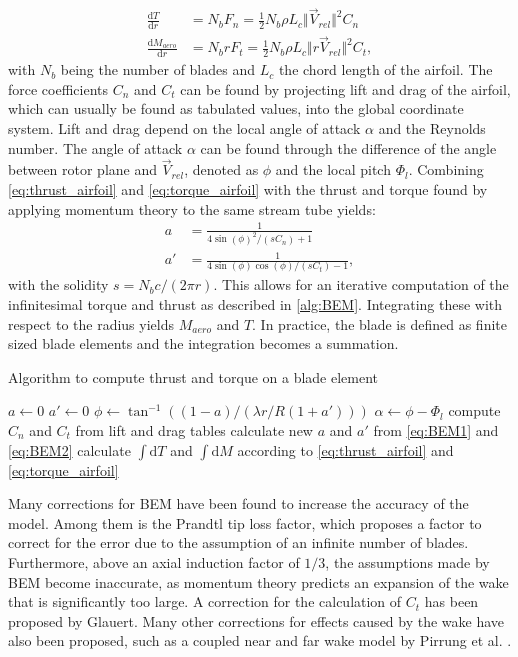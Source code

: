 \begin{align}
\frac{\mathrm{d}T}{\mathrm{d}r} &=N_b F_n = \frac{1}{2}N_b \rho L_c \Vert \vec{V}_{rel} \Vert^2 C_n \label{eq:thrust_airfoil}\\
\frac{\mathrm{d}M_{aero}}{\mathrm{d}r} &= N_b r F_t = \frac{1}{2} N_b\rho L_c \Vert r \vec{V}_{rel} \Vert^2 C_t, \label{eq:torque_airfoil}
\end{align} with $N_b$ being the number of blades and $L_c$ the chord length of the airfoil. The force coefficients $C_n$ and $C_t$ can be found by projecting lift and drag of the airfoil, which can usually be found as tabulated values, into the global coordinate system. Lift and drag depend on the local angle of attack $\alpha$ and the Reynolds number. The angle of attack $\alpha$ can be found through the difference of the angle between rotor plane and $\vec{V}_{rel}$, denoted as $\phi$ and the local pitch $\Phi_l$. Combining \eqref{eq:thrust_airfoil} and \eqref{eq:torque_airfoil} with the thrust and torque found by applying momentum theory to the same stream tube yields:
\begin{align}
a &= \frac{1}{4 \sin(\phi)^2 / \left(s C_n \right) +1} \label{eq:BEM1} \\
a' &= \frac{1}{4 \sin(\phi) \cos(\phi) / \left( s C_t \right) -1}, \label{eq:BEM2}
\end{align}
with the solidity $s = N_b c/(2 \pi r)$. This allows for an iterative computation of the infinitesimal torque and thrust as described in \autoref{alg:BEM}. Integrating these with respect to the radius yields $M_{aero}$ and $T$. In practice, the blade is defined as finite sized blade elements and the integration becomes a summation. \cite[p. 100 - 103]{sorensen_general_2016} \\
\begin{algorithm}
	\caption{Algorithm to compute thrust and torque on a blade element}
	\label{alg:BEM}
	\begin{algorithmic}
			\STATE $a \gets 0$
			\STATE $a'\gets 0$
			\REPEAT
				\STATE $\phi \gets \tan^{-1}((1-a)/(\lambda r/R (1+a') ))$
				\STATE $\alpha \gets \phi - \Phi_l$
				\STATE compute $C_n$ and $C_t$ from lift and drag tables
				\STATE calculate new $a$ and $a'$ from \eqref{eq:BEM1} and \eqref{eq:BEM2}
		\ENDFOR
		\STATE calculate $\int \mathrm{d}T$ and $\int \mathrm{d}M$ according to \eqref{eq:thrust_airfoil} and \eqref{eq:torque_airfoil}
	\end{algorithmic}
\end{algorithm}
Many corrections for BEM have been found to increase the accuracy of the model. Among them is the Prandtl tip loss factor, which proposes a factor to correct for the error due to the assumption of an infinite number of blades. Furthermore, above an axial induction factor of $1/3$, the assumptions made by BEM become inaccurate, as momentum theory predicts an expansion of the wake that is significantly too large. A correction for the calculation of $C_t$ has been proposed by Glauert. Many other corrections for effects caused by the wake have also been proposed, such as a coupled near and far wake model by Pirrung et al. \cite{pirrung_coupled_2016}. \cite[p. 103 - 104]{sorensen_general_2016}
